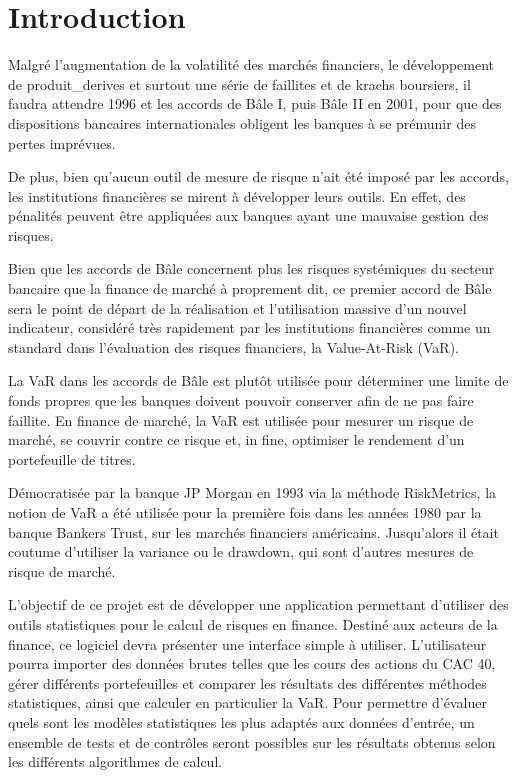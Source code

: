 \chapter{Introduction} 

	Malgré l'augmentation de la volatilité des marchés financiers, le développement de \glspl{produit_derive}\nocite{website:produitDerive} et surtout une série de faillites et de krachs boursiers, il faudra attendre 1996 et les accords de Bâle I, puis Bâle II en 2001, pour que des dispositions bancaires internationales obligent les banques à se prémunir des pertes imprévues.

De plus, bien qu'aucun outil de mesure de risque n'ait été imposé par les accords, les institutions financières se mirent à développer leurs outils. En effet, des pénalités peuvent être appliquées aux banques ayant une mauvaise gestion des risques.

Bien que les accords de Bâle concernent plus les risques systémiques du secteur bancaire que la finance de marché à proprement dit, ce premier accord de Bâle sera le point de départ de la réalisation et l'utilisation massive d'un nouvel indicateur, considéré très rapidement par les institutions financières comme un standard dans l'évaluation des risques financiers, la Value-At-Risk (VaR).

La VaR dans les accords de Bâle est plutôt utilisée pour déterminer une limite de fonds propres que les banques doivent pouvoir conserver afin de ne pas faire faillite. En finance de marché, la VaR est utilisée pour mesurer un risque de marché, se couvrir contre ce risque et, in fine, optimiser le rendement d'un portefeuille de titres.

Démocratisée par la banque JP Morgan en 1993 via la méthode RiskMetrics, la notion de VaR a été utilisée pour la première fois dans les années 1980 par la banque Bankers Trust, sur les marchés financiers américains. Jusqu'alors il était coutume d'utiliser la variance ou le \gls{drawdown}\nocite{drawdown}, qui sont d'autres mesures de risque de marché.

L'objectif de ce projet est de développer une application permettant d'utiliser des outils statistiques pour le calcul de risques en finance. Destiné aux acteurs de la finance, ce logiciel devra présenter une interface simple à utiliser. L'utilisateur pourra importer des données brutes telles que les cours des actions du CAC 40, gérer différents portefeuilles et comparer les résultats des différentes méthodes statistiques, ainsi que calculer en particulier la VaR. Pour permettre d'évaluer quels sont les modèles statistiques les plus adaptés aux données d'entrée, un ensemble de tests et de contrôles seront possibles sur les résultats obtenus selon les différents algorithmes de calcul.

